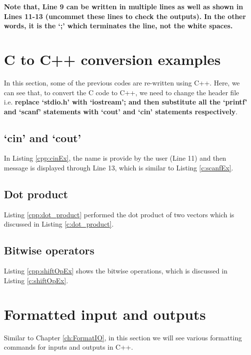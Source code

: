

\textbf{Note that, Line 9 can be written in multiple lines as well as shown in Lines 11-13 (uncommet these lines to check the outputs). In the other words, it is the `;' which terminates the line, not the white spaces.}

\section{C to C++ conversion examples}
In this section, some of the previous codes are re-written using C++. Here, we can see that, to convert the C code to C++, we need to change the header file i.e. \textbf{replace `stdio.h' with `iostream'; and then substitute all the `printf' and `scanf' statements with `cout' and `cin' statements respectively}. 

\subsection{`cin' and `cout'}
In Listing \ref{cpp:cinEx}, the name is provide by the user (Line 11) and then message is displayed through Line 13, which is similar to Listing \ref{c:scanfEx}.


\subsection{Dot product}
Listing \ref{cpp:dot_product} performed the dot product of two vectors which is discussed in Listing \ref{c:dot_product}.



\subsection{Bitwise operators}
Listing \ref{cpp:shiftOpEx} shows the bitwise operations, which is discussed in Listing \ref{c:shiftOpEx}.


\section{Formatted input and outputs}
Similar to Chapter \ref{ch:FormatIO}, in this section we will see various formatting commands for inputs and outputs in C++. 

